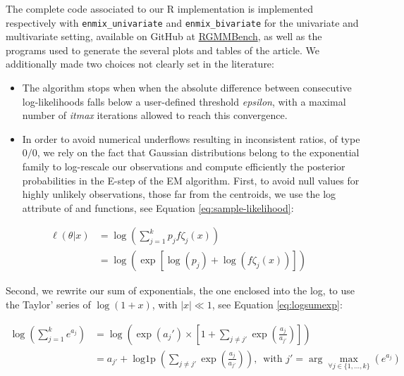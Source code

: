 The complete code associated to our R implementation is implemented respectively
with \texttt{enmix\_univariate} and \texttt{enmix\_bivariate} for the univariate and multivariate setting,
available on GitHub at \href{https://github.com/bastienchassagnol-servier/RGMMBench}{RGMMBench}, as well as the
programs used to generate the several plots and tables of the article.
We additionally made two choices not clearly set in the literature:

\begin{itemize}
\tightlist
\item
  The algorithm stops when when the absolute difference between
  consecutive log-likelihoods falls below a user-defined threshold
  \emph{epsilon}, with a maximal number of \emph{itmax} iterations allowed to reach this convergence.
\item
  In order to avoid numerical underflows resulting in inconsistent ratios, of type \(0/0\), we rely on the fact that Gaussian distributions belong to the exponential family to log-rescale our observations and compute efficiently the posterior probabilities in the E-step of the EM algorithm. First, to avoid null values for highly unlikely observations, those far from the centroids, we use the log attribute of  and
   functions, see Equation \eqref{eq:sample-likelihood}:
\end{itemize}

\begin{equation}
\begin{split}
        \ell (\theta|x) &= \log (\sum_{j=1}^k p_j f{\zeta_j} (x)) \\
        & = \log \left( \exp \left[ \log(p_j) + \log(f{\zeta_j} (x)) \right]\right) \quad
\end{split}
\label{eq:sample-likelihood}
\end{equation}

Second, we rewrite our sum of exponentials, the one enclosed into the log, to use the Taylor' series of \(\log(1+x)\), with \(|x|\ll 1\), see Equation \eqref{eq:logsumexp}:

\begin{equation}
\begin{split}
\log \left( \sum_{j=1}^k e^{a_j}\right)&=\log \left( \exp(a_j') \times \left[ 1+ \sum_{j\neq j'}\exp\left(\frac{a_j}{a_{j'}}\right) \right] \right) \\
& = a_{j'} + \operatorname{log1p} \left(\sum_{j\neq j'}\exp\left(\frac{a_j}{a_{j'}}\right)\right), \, \text{ with } j'=\arg \max_{\forall j \in \{1, \ldots, k\}} (e^{a_j})
\end{split}
\label{eq:logsumexp}
\end{equation}


